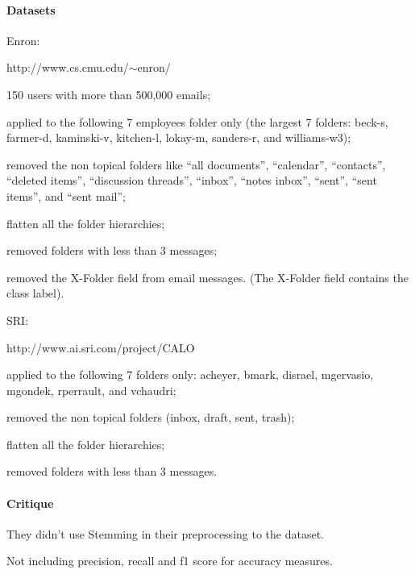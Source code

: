 \documentclass[12pt]{article}
\newenvironment{my_itemize}
{\begin{itemize}
  \setlength{\itemsep}{0cm}
  \setlength{\parskip}{0cm}}
{\end{itemize}}
\begin{document}
\paragraph{Datasets} 
    \begin{my_itemize}
    \item Enron:
    \begin{my_itemize}
	\item http://www.cs.cmu.edu/$\sim$enron/
        \item 150 users with more than 500,000 emails;
        \item applied to the following 7 employees folder only 
	      (the largest 7 folders: beck-s, farmer-d, kaminski-v, 
	      kitchen-l, lokay-m, sanders-r, and williams-w3);
        \item removed the non topical folders like ``all documents'', 
	      ``calendar'', ``contacts'', ``deleted items'', ``discussion threads'', 
	      ``inbox'', ``notes inbox'', ``sent'', ``sent items'', and ``sent mail'';
        \item flatten all the folder hierarchies;
        \item removed folders with less than 3 messages;
        \item removed the X-Folder field from email messages. (The X-Folder 
	      field contains the class label).
    \end{my_itemize}
    \item SRI:
    \begin{my_itemize}
	\item http://www.ai.sri.com/project/CALO
        \item applied to the following 7 folders only: acheyer, bmark, disrael, 
	      mgervasio, mgondek, rperrault, and vchaudri;
        \item removed the non topical folders (inbox, draft, sent, trash);
        \item flatten all the folder hierarchies;
        \item removed folders with less than 3 messages.
    \end{my_itemize}
\end{my_itemize}

\paragraph{Critique}
\begin{my_itemize}
    \item They didn't use Stemming in their preprocessing to the dataset.
    \item Not including precision, recall and f1 score for accuracy measures.
\end{my_itemize}
\end{document}
